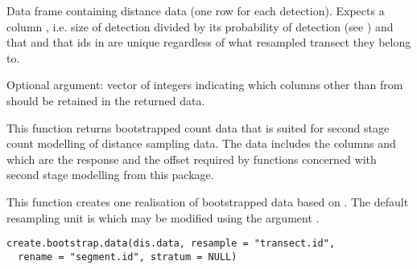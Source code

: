 \documentclass[a4paper]{book}
\begin{document}
%
\begin{Arguments}
\begin{ldescription}
\item[\code{dis.data}] Data frame containing distance data (one row for each detection). Expects a column , i.e. size of detection divided by its probability of detection (see ) and that and that ids in  are unique regardless of what resampled transect they belong to.

\item[\code{column.numbers}] Optional argument: vector of integers indicating which columns other than  from  should be retained in the returned data.
\end{ldescription}
\end{Arguments}
%
\begin{Value}
This function returns bootstrapped count data that is suited for second stage count modelling of distance sampling 
data. The data includes the columns  and  which are the response and
the offset required by functions concerned with second stage modelling from this package.
\end{Value}
%
\begin{Examples}
\end{Examples}
%
\begin{Description}\relax
This function creates one realisation of bootstrapped data based on . 
The default resampling unit is  which may be modified using the argument .
\end{Description}
%
\begin{Usage}
\begin{verbatim}
create.bootstrap.data(dis.data, resample = "transect.id",
  rename = "segment.id", stratum = NULL)
\end{verbatim}
\end{Usage}
\end{document}

